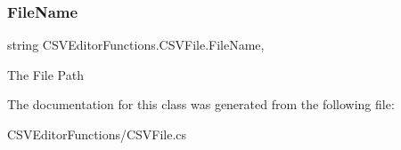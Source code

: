 \mbox{\label{class_c_s_v_editor_functions_1_1_c_s_v_file_ad692567c4f95f23945cf661da3d573c8}} 
\subsubsection{\texorpdfstring{FileName}{FileName}}
{\footnotesize\ttfamily string C\+S\+V\+Editor\+Functions.\+C\+S\+V\+File.\+File\+Name\hspace{0.3cm}{\ttfamily [get]}, {\ttfamily [set]}}



The File Path 



The documentation for this class was generated from the following file\+:\begin{DoxyCompactItemize}
\item 
C\+S\+V\+Editor\+Functions/C\+S\+V\+File.\+cs\end{DoxyCompactItemize}
